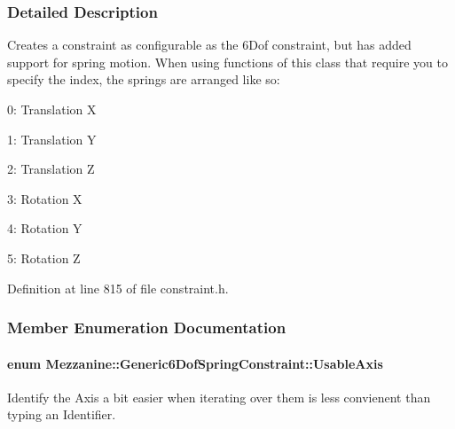 \subsubsection{Detailed Description}
Creates a constraint as configurable as the 6Dof constraint, but has added support for spring motion. When using functions of this class that require you to specify the index, the springs are arranged like so: \par

\begin{DoxyItemize}
\item 0: Translation X
\item 1: Translation Y
\item 2: Translation Z
\item 3: Rotation X
\item 4: Rotation Y
\item 5: Rotation Z 
\end{DoxyItemize}

Definition at line 815 of file constraint.h.



\subsubsection{Member Enumeration Documentation}
\hypertarget{classMezzanine_1_1Generic6DofSpringConstraint_acdffbc070d80b5480bf1020d4a2351ed}{
\paragraph[{UsableAxis}]{\setlength{\rightskip}{0pt plus 5cm}enum {\bf Mezzanine::Generic6DofSpringConstraint::UsableAxis}}\hfill}
\label{classMezzanine_1_1Generic6DofSpringConstraint_acdffbc070d80b5480bf1020d4a2351ed}


Identify the Axis a bit easier when iterating over them is less convienent than typing an Identifier. 

